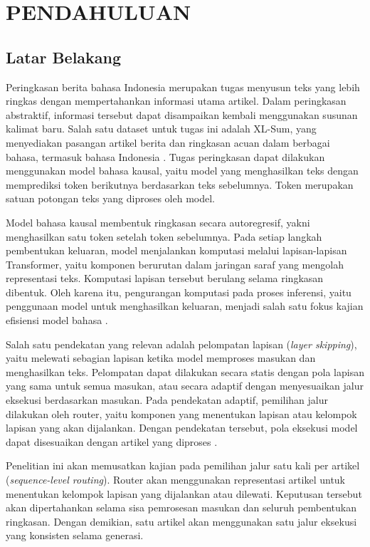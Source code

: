 \chapter{PENDAHULUAN}

\section{Latar Belakang}

Peringkasan berita bahasa Indonesia merupakan tugas menyusun teks yang lebih ringkas dengan mempertahankan informasi utama artikel. Dalam peringkasan abstraktif, informasi tersebut dapat disampaikan kembali menggunakan susunan kalimat baru. Salah satu dataset untuk tugas ini adalah XL-Sum, yang menyediakan pasangan artikel berita dan ringkasan acuan dalam berbagai bahasa, termasuk bahasa Indonesia \citep{hasan2021xlsum}. Tugas peringkasan dapat dilakukan menggunakan model bahasa kausal, yaitu model yang menghasilkan teks dengan memprediksi token berikutnya berdasarkan teks sebelumnya. Token merupakan satuan potongan teks yang diproses oleh model.

Model bahasa kausal membentuk ringkasan secara autoregresif, yakni menghasilkan satu token setelah token sebelumnya. Pada setiap langkah pembentukan keluaran, model menjalankan komputasi melalui lapisan-lapisan Transformer, yaitu komponen berurutan dalam jaringan saraf yang mengolah representasi teks. Komputasi lapisan tersebut berulang selama ringkasan dibentuk. Oleh karena itu, pengurangan komputasi pada proses inferensi, yaitu penggunaan model untuk menghasilkan keluaran, menjadi salah satu fokus kajian efisiensi model bahasa \citep{jain2025first}.

Salah satu pendekatan yang relevan adalah pelompatan lapisan (\textit{layer skipping}), yaitu melewati sebagian lapisan ketika model memproses masukan dan menghasilkan teks. Pelompatan dapat dilakukan secara statis dengan pola lapisan yang sama untuk semua masukan, atau secara adaptif dengan menyesuaikan jalur eksekusi berdasarkan masukan. Pada pendekatan adaptif, pemilihan jalur dilakukan oleh router, yaitu komponen yang menentukan lapisan atau kelompok lapisan yang akan dijalankan. Dengan pendekatan tersebut, pola eksekusi model dapat disesuaikan dengan artikel yang diproses \citep{jain2025first,wee2025pudding}.

Penelitian ini akan memusatkan kajian pada pemilihan jalur satu kali per artikel (\textit{sequence-level routing}). Router akan menggunakan representasi artikel untuk menentukan kelompok lapisan yang dijalankan atau dilewati. Keputusan tersebut akan dipertahankan selama sisa pemrosesan masukan dan seluruh pembentukan ringkasan. Dengan demikian, satu artikel akan menggunakan satu jalur eksekusi yang konsisten selama generasi.

